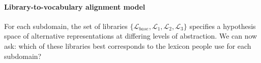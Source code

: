 


\paragraph{Library-to-vocabulary alignment model}
For each subdomain, the set of libraries $\{\mathcal{L}_{base}, \mathcal{L}_1, \mathcal{L}_2, \mathcal{L}_3\}$ specifies a hypothesis space of alternative representations at differing levels of abstraction. We can now ask: which of these libraries best corresponds to the lexicon people use for each subdomain?


